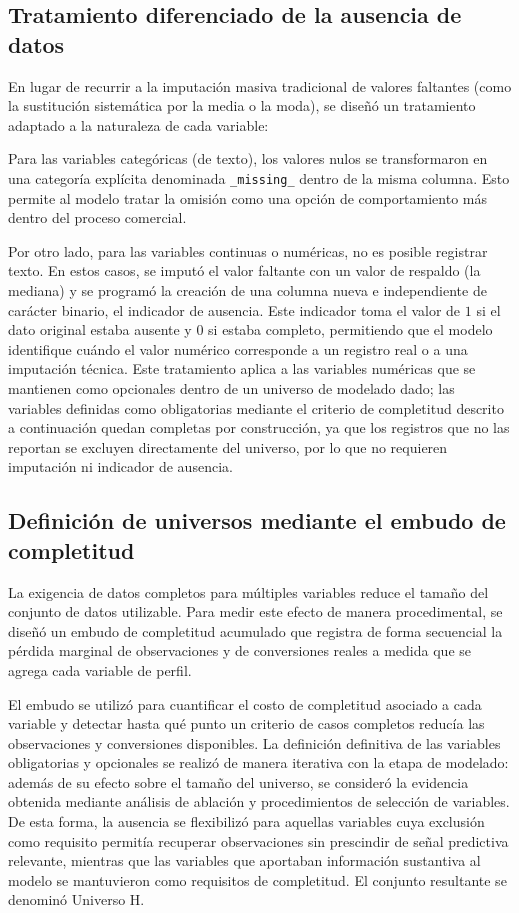 \subsection{Tratamiento diferenciado de la ausencia de datos}
En lugar de recurrir a la imputación masiva tradicional de valores faltantes (como la sustitución sistemática por la media o la moda), se diseñó un tratamiento adaptado a la naturaleza de cada variable:

Para las variables categóricas (de texto), los valores nulos se transformaron en una categoría explícita denominada \texttt{\_missing\_} dentro de la misma columna. Esto permite al modelo tratar la omisión como una opción de comportamiento más dentro del proceso comercial.

Por otro lado, para las variables continuas o numéricas, no es posible registrar texto. En estos casos, se imputó el valor faltante con un valor de respaldo (la mediana) y se programó la creación de una columna nueva e independiente de carácter binario, el indicador de ausencia. Este indicador toma el valor de $1$ si el dato original estaba ausente y $0$ si estaba completo, permitiendo que el modelo identifique cuándo el valor numérico corresponde a un registro real o a una imputación técnica. Este tratamiento aplica a las variables numéricas que se mantienen como opcionales dentro de un universo de modelado dado; las variables definidas como obligatorias mediante el criterio de completitud descrito a continuación quedan completas por construcción, ya que los registros que no las reportan se excluyen directamente del universo, por lo que no requieren imputación ni indicador de ausencia.

\subsection{Definición de universos mediante el embudo de completitud}
\label{sec:met-universo}
La exigencia de datos completos para múltiples variables reduce el tamaño del conjunto de datos utilizable. Para medir este efecto de manera procedimental, se diseñó un embudo de completitud acumulado que registra de forma secuencial la pérdida marginal de observaciones y de conversiones reales a medida que se agrega cada variable de perfil.

El embudo se utilizó para cuantificar el costo de completitud asociado a cada variable y detectar hasta qué punto un criterio de casos completos reducía las observaciones y conversiones disponibles. La definición definitiva de las variables obligatorias y opcionales se realizó de manera iterativa con la etapa de modelado: además de su efecto sobre el tamaño del universo, se consideró la evidencia obtenida mediante análisis de ablación y procedimientos de selección de variables. De esta forma, la ausencia se flexibilizó para aquellas variables cuya exclusión como requisito permitía recuperar observaciones sin prescindir de señal predictiva relevante, mientras que las variables que aportaban información sustantiva al modelo se mantuvieron como requisitos de completitud. El conjunto resultante se denominó Universo H.

